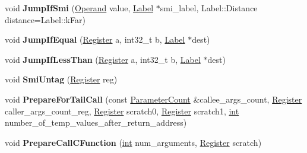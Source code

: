 \begin{DoxyCompactItemize}
\item 
\mbox{\label{classv8_1_1internal_1_1TurboAssembler_aada4bc65824f53756c2a8323c86e8790}} 
void {\bfseries Jump\+If\+Smi} (\mbox{\hyperlink{classv8_1_1internal_1_1Operand}{Operand}} value, \mbox{\hyperlink{classv8_1_1internal_1_1Label}{Label}} $\ast$smi\+\_\+label, Label\+::\+Distance distance=Label\+::k\+Far)
\item 
\mbox{\label{classv8_1_1internal_1_1TurboAssembler_a6a1ea79d2ea01a7fb089c190987d1ed9}} 
void {\bfseries Jump\+If\+Equal} (\mbox{\hyperlink{classv8_1_1internal_1_1Register}{Register}} a, int32\+\_\+t b, \mbox{\hyperlink{classv8_1_1internal_1_1Label}{Label}} $\ast$dest)
\item 
\mbox{\label{classv8_1_1internal_1_1TurboAssembler_ae7372b736764b88436b9d1a496b2288f}} 
void {\bfseries Jump\+If\+Less\+Than} (\mbox{\hyperlink{classv8_1_1internal_1_1Register}{Register}} a, int32\+\_\+t b, \mbox{\hyperlink{classv8_1_1internal_1_1Label}{Label}} $\ast$dest)
\item 
\mbox{\label{classv8_1_1internal_1_1TurboAssembler_a928bb2043ef98e694176a9220ccaeaf8}} 
void {\bfseries Smi\+Untag} (\mbox{\hyperlink{classv8_1_1internal_1_1Register}{Register}} reg)
\item 
\mbox{\label{classv8_1_1internal_1_1TurboAssembler_aa7e681f5f8738c1329bac3c6c888df12}} 
void {\bfseries Prepare\+For\+Tail\+Call} (const \mbox{\hyperlink{classv8_1_1internal_1_1ParameterCount}{Parameter\+Count}} \&callee\+\_\+args\+\_\+count, \mbox{\hyperlink{classv8_1_1internal_1_1Register}{Register}} caller\+\_\+args\+\_\+count\+\_\+reg, \mbox{\hyperlink{classv8_1_1internal_1_1Register}{Register}} scratch0, \mbox{\hyperlink{classv8_1_1internal_1_1Register}{Register}} scratch1, \mbox{\hyperlink{classint}{int}} number\+\_\+of\+\_\+temp\+\_\+values\+\_\+after\+\_\+return\+\_\+address)
\item 
\mbox{\label{classv8_1_1internal_1_1TurboAssembler_af3e2f732a4bde36425dd4d95fa6cf067}} 
void {\bfseries Prepare\+Call\+C\+Function} (\mbox{\hyperlink{classint}{int}} num\+\_\+arguments, \mbox{\hyperlink{classv8_1_1internal_1_1Register}{Register}} scratch)

\end{DoxyCompactItemize}
